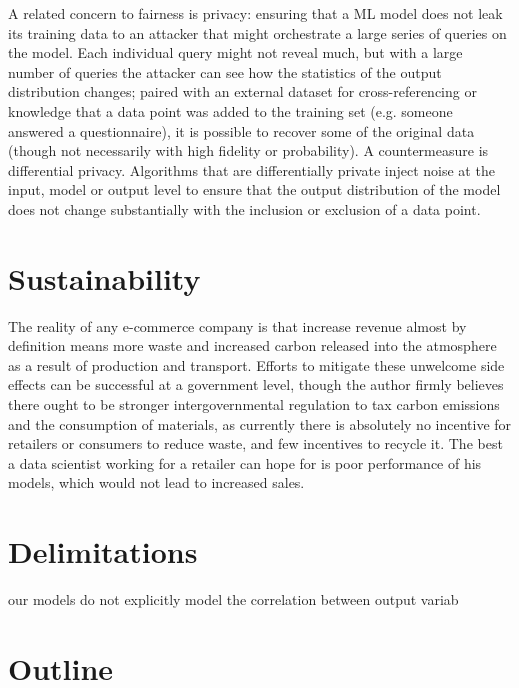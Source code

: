 A related concern to fairness is privacy: ensuring that a ML model does not leak its training data to an attacker that might orchestrate a large series of queries on the model.
Each individual query might not reveal much, but with a large number of queries the attacker can see how the statistics of the output distribution changes; paired with an external dataset for cross-referencing or knowledge that a data point was added to the training set (e.g. someone answered a questionnaire), it is possible to recover some of the original data (though not necessarily with high fidelity or probability).
A countermeasure is differential privacy.
Algorithms that are differentially private inject noise at the input, model or output level to ensure that the output distribution of the model does not change substantially with the inclusion or exclusion of a data point.

\section{Sustainability}

The reality of any e-commerce company is that increase revenue almost by definition means more waste  and increased carbon released into the atmosphere  as a result of production and transport.
Efforts to mitigate these unwelcome side effects can be successful at a government level, though  the author firmly believes there ought to be stronger intergovernmental regulation to tax carbon emissions and the consumption of materials, as currently there is absolutely no incentive for retailers or consumers to reduce waste, and few incentives to recycle it.
The best a data scientist working for a retailer can hope for is poor performance of his models, which would not lead to increased sales.

\section{Delimitations}

our models do not explicitly model the correlation between output variab

\section{Outline}
